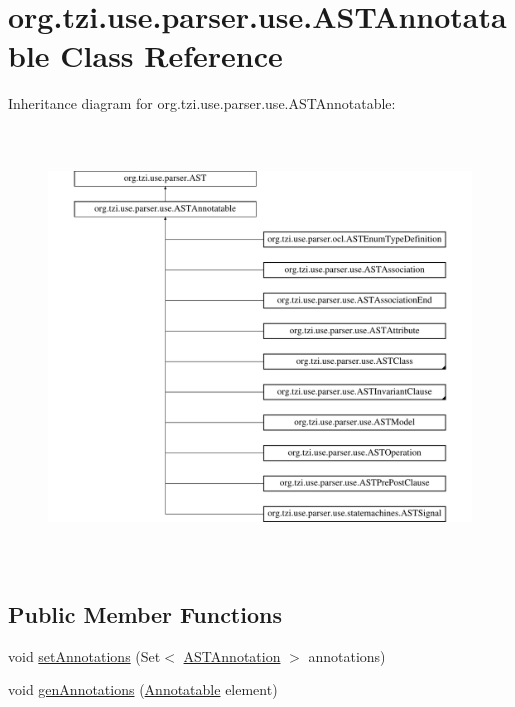 \hypertarget{classorg_1_1tzi_1_1use_1_1parser_1_1use_1_1_a_s_t_annotatable}{\section{org.\-tzi.\-use.\-parser.\-use.\-A\-S\-T\-Annotatable Class Reference}
\label{classorg_1_1tzi_1_1use_1_1parser_1_1use_1_1_a_s_t_annotatable}
}
Inheritance diagram for org.\-tzi.\-use.\-parser.\-use.\-A\-S\-T\-Annotatable\-:\begin{figure}[H]
\begin{center}
\leavevmode
\includegraphics[height=11.586206cm]{classorg_1_1tzi_1_1use_1_1parser_1_1use_1_1_a_s_t_annotatable}
\end{center}
\end{figure}
\subsection*{Public Member Functions}
\begin{DoxyCompactItemize}
\item 
void \hyperlink{classorg_1_1tzi_1_1use_1_1parser_1_1use_1_1_a_s_t_annotatable_a6f83da7e6309adb223ede42895bf66a4}{set\-Annotations} (Set$<$ \hyperlink{classorg_1_1tzi_1_1use_1_1parser_1_1use_1_1_a_s_t_annotation}{A\-S\-T\-Annotation} $>$ annotations)
\item 
void \hyperlink{classorg_1_1tzi_1_1use_1_1parser_1_1use_1_1_a_s_t_annotatable_a1632221cd9cc788544f8107d842666f8}{gen\-Annotations} (\hyperlink{interfaceorg_1_1tzi_1_1use_1_1uml_1_1mm_1_1_annotatable}{Annotatable} element)
\end{DoxyCompactItemize}


